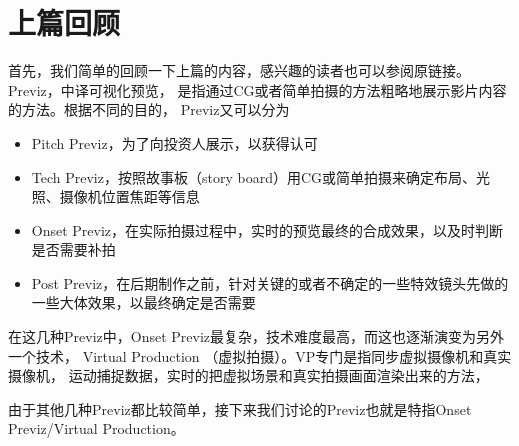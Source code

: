 \section*{上篇回顾}

首先，我们简单的回顾一下上篇的内容，感兴趣的读者也可以参阅原链接。
Previz，中译可视化预览， 是指通过CG或者简单拍摄的方法粗略地展示影片内容的方法。根据不同的目的， Previz又可以分为
\begin{itemize}
	\item Pitch Previz，为了向投资人展示，以获得认可
	\item Tech Previz，按照故事板（story board）用CG或简单拍摄来确定布局、光照、摄像机位置焦距等信息
	\item Onset Previz，在实际拍摄过程中，实时的预览最终的合成效果，以及时判断是否需要补拍
	\item Post Previz，在后期制作之前，针对关键的或者不确定的一些特效镜头先做的一些大体效果，以最终确定是否需要
\end{itemize}

在这几种Previz中，Onset Previz最复杂，技术难度最高，而这也逐渐演变为另外一个技术， Virtual Production （虚拟拍摄）。VP专门是指同步虚拟摄像机和真实摄像机， 运动捕捉数据，实时的把虚拟场景和真实拍摄画面渲染出来的方法，

由于其他几种Previz都比较简单，接下来我们讨论的Previz也就是特指Onset Previz/Virtual Production。
